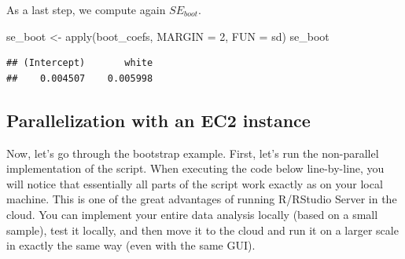 \documentclass[
  12pt,
]{style/krantz}
\newenvironment{Shaded}{\begin{snugshade}}{\end{snugshade}}
\newcommand{\AttributeTok}[1]{\textcolor[rgb]{0.77,0.63,0.00}{#1}}
\newcommand{\DecValTok}[1]{\textcolor[rgb]{0.00,0.00,0.81}{#1}}
\newcommand{\FunctionTok}[1]{\textcolor[rgb]{0.00,0.00,0.00}{#1}}
\newcommand{\NormalTok}[1]{#1}
\newcommand{\OtherTok}[1]{\textcolor[rgb]{0.56,0.35,0.01}{#1}}
\begin{document}
As a last step, we compute again \(SE_{boot}\).

\begin{Shaded}
\begin{Highlighting}[]
\NormalTok{se\_boot }\OtherTok{\textless{}{-}} \FunctionTok{apply}\NormalTok{(boot\_coefs, }
                 \AttributeTok{MARGIN =} \DecValTok{2}\NormalTok{,}
                 \AttributeTok{FUN =}\NormalTok{ sd)}
\NormalTok{se\_boot}
\end{Highlighting}
\end{Shaded}

\begin{verbatim}
## (Intercept)       white 
##    0.004507    0.005998
\end{verbatim}

\hypertarget{parallelization-with-an-ec2-instance-1}{%
\subsection{Parallelization with an EC2 instance}\label{parallelization-with-an-ec2-instance-1}}

Now, let's go through the bootstrap example. First, let's run the non-parallel implementation of the script. When executing the code below line-by-line, you will notice that essentially all parts of the script work exactly as on your local machine. This is one of the great advantages of running R/RStudio Server in the cloud. You can implement your entire data analysis locally (based on a small sample), test it locally, and then move it to the cloud and run it on a larger scale in exactly the same way (even with the same GUI).
\end{document}
